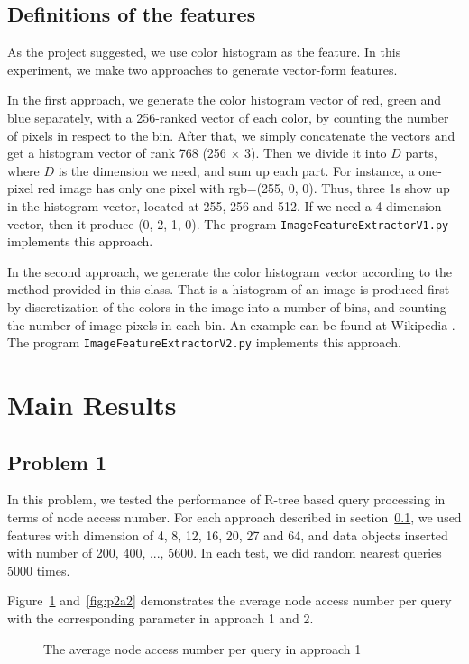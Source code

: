 \documentclass{acm_proc_article-sp}
\begin{document}
\subsection{Definitions of the features}
\label{feature definition}
As the project suggested, we use color histogram as the feature. In this experiment, we make two approaches to generate vector-form features.

In the first approach, we generate the color histogram vector of red, green and blue separately, with a 256-ranked vector of each color, by counting the number of pixels in respect to the bin. After that, we simply concatenate the vectors and get a histogram vector of rank 768 (256 $\times$ 3). Then we divide it into $D$ parts, where $D$ is the dimension we need, and sum up each part. For instance, a one-pixel red image has only one pixel with rgb=(255, 0, 0). Thus, three 1s show up in the histogram vector, located at 255, 256 and 512. If we need a 4-dimension vector, then it produce (0, 2, 1, 0). The program \texttt{ImageFeatureExtractorV1.py} implements this approach.

In the second approach, we generate the color histogram vector according to the method provided in this class. That is a histogram of an image is produced first by discretization of the colors in the image into a number of bins, and counting the number of image pixels in each bin. An example can be found at Wikipedia \cite{website:wikihist}. The program \texttt{ImageFeatureExtractorV2.py} implements this approach.

\section{Main Results}
\subsection{Problem 1}
In this problem, we tested the performance of R-tree based query processing in terms of node access number. For each approach described in section~\ref{feature definition}, we used features with dimension of 4, 8, 12, 16, 20, 27 and 64, and data objects inserted with number of 200, 400, ..., 5600. In each test, we did random nearest queries 5000 times.

Figure~\ref{fig:p2a1} and~\ref{fig:p2a2} demonstrates the average node access number per query with the corresponding parameter in approach 1 and 2.

\begin{figure}
\centering
{}
\caption{The average node access number per query in approach 1}
\label{fig:p2a1}
\end{figure}
\end{document}
